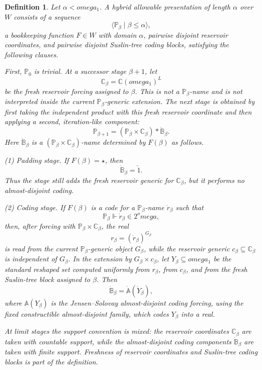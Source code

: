 \documentclass{article}
\newtheorem{definition}[theorem]{Definition}
\theoremstyle{remark}
\theoremstyle{plain}
\newcommand{\forceP}{\mathbb{P}}
\newcommand{\one}{\mathbf{1}}
\def\mathbf#1{#1}%
\def\omega{omega}%
\begin{document}
\begin{definition}\label{def:allowable0}
Let \(\alpha<\omega_1\). A \emph{hybrid allowable presentation of length \(\alpha\)} over \(W\) consists of a sequence
\[
   \langle \forceP_\beta\mid \beta\leq\alpha\rangle,
\]
a bookkeeping function \(F\in W\) with domain \(\alpha\), pairwise disjoint reservoir coordinates, and pairwise disjoint Suslin-tree coding blocks, satisfying the following clauses.

First, \(\forceP_0\) is trivial. At a successor stage \(\beta+1\), let
\[
   \mathbb C_\beta
   =\mathbb C(\omega_1)^L
\]
be the fresh reservoir forcing assigned to \(\beta\). This is not a
\(\forceP_\beta\)-name and is not interpreted inside the current
\(\forceP_\beta\)-generic extension. The next stage is obtained by first taking the independent product with this fresh reservoir coordinate and then applying a second, iteration-like component:
\[
   \forceP_{\beta+1}
   =
   (\forceP_\beta\times \mathbb C_\beta)*\dot{\mathbb B}_\beta.
\]
Here \(\dot{\mathbb B}_\beta\) is a
\((\forceP_\beta\times\mathbb C_\beta)\)-name determined by \(F(\beta)\) as follows.

\smallskip
\noindent\textup{(1) Padding stage.}
If \(F(\beta)=\star\), then
\[
   \dot{\mathbb B}_\beta=\check{\one}.
\]
Thus the stage still adds the fresh reservoir generic for \(\mathbb C_\beta\), but it performs no almost-disjoint coding.

\smallskip
\noindent\textup{(2) Coding stage.}
If \(F(\beta)\) is a code for a \(\forceP_\beta\)-name \(\dot r_\beta\) such that
\[
   \forceP_\beta\Vdash \dot r_\beta\in 2^\omega,
\]
then, after forcing with \(\forceP_\beta\times\mathbb C_\beta\), the real
\[
   r_\beta=(\dot r_\beta)^{G_\beta}
\]
is read from the current \(\forceP_\beta\)-generic object \(G_\beta\), while the reservoir generic \(c_\beta\subseteq\mathbb C_\beta\) is independent of \(G_\beta\). In the extension by \(G_\beta\times c_\beta\), let \(Y_\beta\subseteq\omega_1\) be the standard reshaped set computed uniformly from \(r_\beta\), from \(c_\beta\), and from the fresh Suslin-tree block assigned to \(\beta\). Then
\[
   \dot{\mathbb B}_\beta=\dot{\mathbb A}(\dot Y_\beta),
\]
where \(\mathbb A(Y_\beta)\) is the Jensen--Solovay almost-disjoint coding forcing, using the fixed constructible almost-disjoint family, which codes \(Y_\beta\) into a real.

At limit stages the support convention is mixed: the reservoir coordinates \(\mathbb C_\beta\) are taken with countable support, while the almost-disjoint coding components \(\dot{\mathbb B}_\beta\) are taken with finite support. Freshness of reservoir coordinates and Suslin-tree coding blocks is part of the definition.


\end{definition}
\end{document}

